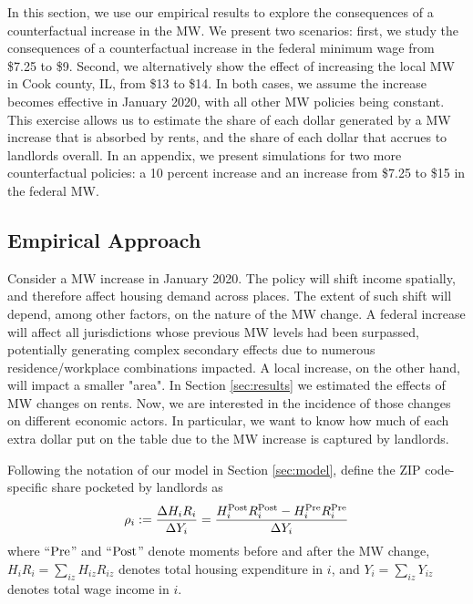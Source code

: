 
In this section, we use our empirical results to explore the consequences of 
a counterfactual increase in the MW. We present two scenarios: first, we study
the consequences of a counterfactual increase in the federal minimum wage
from \$7.25 to \$9. Second, we alternatively show the effect of increasing the
local MW in Cook county, IL, from \$13 to \$14. In both cases, we assume the
increase becomes effective in January 2020, with all other MW policies being
constant. This exercise allows us to estimate the share of each dollar
generated by a MW increase that is absorbed by rents, and the share
of each dollar that accrues to landlords overall. In an appendix, we present
simulations for two more counterfactual policies: a 10 percent increase and
an increase from \$7.25 to \$15 in the federal MW.


\subsection{Empirical Approach}\label{sec:emp_cf}

Consider a MW increase in January 2020.
The policy will shift income spatially, and therefore affect housing demand
across places. The extent of such shift will depend, among other factors,
on the nature of the MW change. A federal increase will affect all jurisdictions
whose previous MW levels had been surpassed, potentially generating complex
secondary effects due to numerous residence/workplace combinations impacted.
A local increase, on the other hand, will impact a smaller "area".
In Section \ref{sec:results} we estimated the effects of MW changes on rents.
Now, we are interested in the incidence of those changes on different economic
actors.
In particular, we want to know how much of each extra dollar put on the table 
due to the MW increase is captured by landlords.

Following the notation of our model in Section \ref{sec:model}, define the 
ZIP code-specific share pocketed by landlords as
\begin{equation*}
    \rho_i := \frac{\Delta H_i R_i}{\Delta Y_i} 
            = \frac{H^{\text{Post}}_i R^{\text{Post}}_i - H^{\text{Pre}}_i R^{\text{Pre}}_i}{\Delta Y_i} 
\end{equation*}
where
``$\text{Pre}$'' and ``$\text{Post}$'' denote moments before and after the MW change,
$H_i R_i = \sum_{iz} H_{iz} R_{iz}$ denotes total housing expenditure in $i$, and
$Y_i = \sum_{iz} Y_{iz}$ denotes total wage income in $i$.

